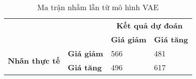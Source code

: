 \narrowlinespacing

\begin{table}[H] 
    \centering
    \caption{Ma trận nhầm lẫn từ mô hình VAE}
    \begin{tabularx}{0.7\textwidth}{
    p{}%
    p{}%
    p{}
    p{}
    }
        
        \toprule\midrule
        \textbf{} & \textbf{} & \multicolumn{2}{c}{\textbf{Kết quả dự đoán}} \\
        \cmidrule(rl){3-4}
        \textbf{} & \textbf{} & \textbf{Giá giảm} & \textbf{Giá tăng} \\
        \midrule
        


        \multirow{2}{*}{\textbf{Nhãn thực tế }}  & \textbf{Giá giảm} & 566 & 481\\
        & \textbf{Giá tăng} & 496 & 617 \\
        \midrule
        \bottomrule
        
    \end{tabularx}
    \label{tab:vae_confusion_matrix}
\end{table}
